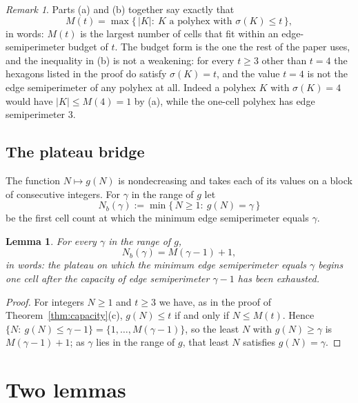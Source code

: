 \documentclass[11pt]{article}
\theoremstyle{plain}
\newtheorem{lemma}[theorem]{Lemma}
\theoremstyle{definition}
\theoremstyle{remark}
\newtheorem{remark}[theorem]{Remark}
\begin{document}
\begin{remark}\label{rem:attain}
Parts (a) and (b) together say exactly that
\[
   M(t)=\max\{\,|K|:\ K\text{ a polyhex with }\sigma(K)\le t\,\},
\]
in words: \(M(t)\) is the largest number of cells that fit within an edge-semiperimeter
budget of \(t\). The budget form is the one the rest of the paper uses, and the
inequality in (b) is not a weakening: for every \(t\ge3\) other than \(t=4\) the
hexagons listed in the proof do satisfy \(\sigma(K)=t\), and the value \(t=4\) is not the
edge semiperimeter of any polyhex at all. Indeed a polyhex \(K\) with \(\sigma(K)=4\)
would have \(|K|\le M(4)=1\) by (a), while the one-cell polyhex has edge semiperimeter
\(3\).
\end{remark}

\subsection{The plateau bridge}\label{sec:2.7}

The function \(N\mapsto g(N)\) is nondecreasing and takes each of its values on a block of
consecutive integers. For \(\gamma\) in the range of \(g\) let
\[
   N_{b}(\gamma):=\min\{\,N\ge1:\ g(N)=\gamma\,\}
\]
be the first cell count at which the minimum edge semiperimeter equals \(\gamma\).

\begin{lemma}\label{lem:bridge}
For every \(\gamma\) in the range of \(g\),
\begin{equation}\label{eq:bridge}
   N_{b}(\gamma)=M(\gamma-1)+1 ,
\end{equation}
in words: the plateau on which the minimum edge semiperimeter equals \(\gamma\) begins one
cell after the capacity of edge semiperimeter \(\gamma-1\) has been exhausted.
\end{lemma}

\begin{proof}
For integers \(N\ge1\) and \(t\ge3\) we have, as in the proof of
Theorem~\ref{thm:capacity}(c), \(g(N)\le t\) if and only if \(N\le M(t)\). Hence
\(\{N:\ g(N)\le\gamma-1\}=\{1,\dots,M(\gamma-1)\}\), so the least \(N\) with
\(g(N)\ge\gamma\) is \(M(\gamma-1)+1\); as \(\gamma\) lies in the range of \(g\), that
least \(N\) satisfies \(g(N)=\gamma\).
\end{proof}




\section{Two lemmas}
\end{document}
